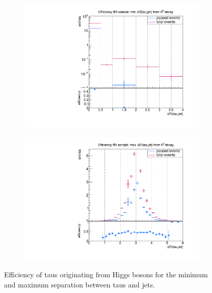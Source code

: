 \begin{figure}
  \centering
                \begin{subfigure}[t]{0.49\textwidth}
                \includegraphics[width=\textwidth]{figures/plots/ttH/Divided_fromH_mindR_taujet.pdf}
                \label{dR:fromH:taujets:min}
                \end{subfigure}
                \begin{subfigure}[t]{0.49\textwidth}
                \includegraphics[width=\textwidth]{figures/plots/ttH/Divided_maxdR_fromH_taujet.pdf}
                \label{dR:fromH:taujets:max}
                \end{subfigure}
\caption[Efficiency of taus originating from Higgs bosons for the separation between taus and jets.]{Efficiency of taus originating from Higgs bosons for the minimum and maximum separation between taus and jets.}
\label{dR:fromH:taujets}
\end{figure}
